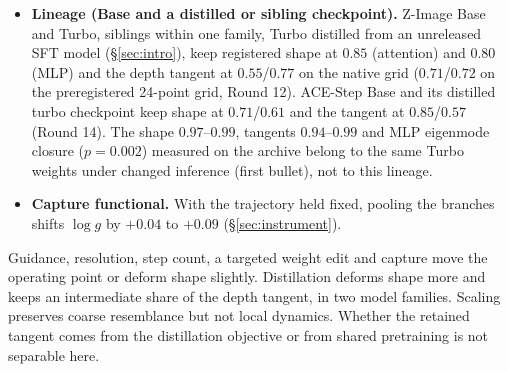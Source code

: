 \documentclass[11pt]{article}
\begin{document}
\begin{itemize}
 \item \textbf{Lineage (Base and a distilled or sibling checkpoint).} Z-Image Base and Turbo, siblings within one family, Turbo distilled from an unreleased SFT model (\S\ref{sec:intro}), keep registered shape at $0.85$ (attention) and $0.80$ (MLP) and the depth tangent at $0.55$/$0.77$ on the native grid ($0.71$/$0.72$ on the preregistered 24-point grid, Round 12). ACE-Step Base and its distilled turbo checkpoint keep shape at $0.71$/$0.61$ and the tangent at $0.85$/$0.57$ (Round 14). The shape $0.97$--$0.99$, tangents $0.94$--$0.99$ and MLP eigenmode closure ($p=0.002$) measured on the archive belong to the same Turbo weights under changed inference (first bullet), not to this lineage.
 \item \textbf{Capture functional.} With the trajectory held fixed, pooling the branches shifts $\log g$ by $+0.04$ to $+0.09$ (\S\ref{sec:instrument}).
\end{itemize}
Guidance, resolution, step count, a targeted weight edit and capture move the operating point or deform shape slightly. Distillation deforms shape more and keeps an intermediate share of the depth tangent, in two model families. Scaling preserves coarse resemblance but not local dynamics. Whether the retained tangent comes from the distillation objective or from shared pretraining is not separable here.
\end{document}
